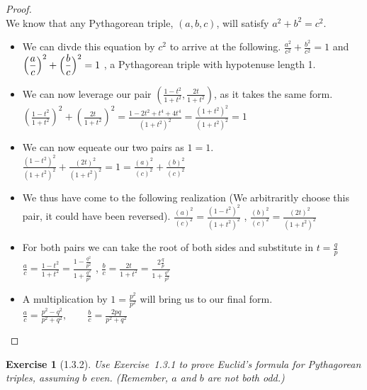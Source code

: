 \documentclass[10pt]{article}
\theoremstyle{plain}
\newtheorem{ex}{Exercise}
\begin{document}
\begin{proof}
  \ \\
  We know that any Pythagorean triple, $(a,b,c)$,  will satisfy $a^{2}+b^{2}=c^{2}$.
  \begin{itemize}
    \item We can divde this equation by $c^2$ to arrive at the following.
    \subitem  $\displaystyle \frac{a^{2}}{c^{2}}+\frac{b^{2}}{c^{2}}=1$ and $\displaystyle \Bigl(\frac{a}{c}\Bigr)^{2}+\Bigl(\frac{b}{c}\Bigr)^{2}=1$ , a Pythagorean triple with hypotenuse length 1.
    \item We can now leverage our pair $\displaystyle \left(\frac{1-t^2}{1+t^2},\frac{2t}{1+t^2}\right)$, as it takes the same form.
    \subitem $\displaystyle \left(\frac{1-t^2}{1+t^2}\right)^{2}+\left(\frac{2t}{1+t^2}\right)^{2} = \frac{1-2t^{2}+t^{4}+4t^{4}}{(1+t^2)^{2}} = \frac{(1+t^2)^{2}}{(1+t^2)^{2}} = 1$ 
    \item We can now equeate our two pairs as $1=1$.
    \subitem $\displaystyle \frac{(1-t^2)^{2}}{(1+t^2)^{2}}+\frac{(2t)^{2}}{(1+t^2)^{2}} = 1 = \frac{(a)^{2}}{(c)^{2}}+\frac{(b)^{2}}{(c)^{2}}$
    \item We thus have come to the following realization (We arbitraritly choose this pair, it could have been reversed).
    \subitem $\displaystyle \frac{(a)^{2}}{(c)^{2}}=\frac{(1-t^2)^{2}}{(1+t^2)^{2}}$ , $\displaystyle \frac{(b)^{2}}{(c)^{2}}=\frac{(2t)^{2}}{(1+t^2)^{2}}$
    \item For both pairs we can take the root of both sides and substitute in $\displaystyle t=\frac{q}{p}$
    \subitem $\displaystyle \frac{a}{c}=\frac{1-t^2}{1+t^2}=\frac{1-\frac{q^{2}}{p^{2}}}{1+\frac{q^{2}}{p^{2}}}$ , $\displaystyle \frac{b}{c}=\frac{2t}{1+t^2}=\frac{2\frac{q}{p}}{1+\frac{q^{2}}{p^{2}}}$
    \item A multiplication by $1 = \frac{p^{2}}{p^{2}}$ will bring us to our final form.
    \subitem $\displaystyle \frac{a}{c}=\frac{p^2-q^2}{p^2+q^2},\qquad\frac{b}{c}=\frac{2pq}{p^2+q^2}$
  \end{itemize}
\end{proof}

\hrulefill

\begin{ex} [1.3.2]
  Use Exercise~1.3.1 to prove Euclid's formula for Pythagorean triples, assuming $b$ even. (Remember, $a$ and $b$ are not both odd.)
\end{ex}
\end{document}
